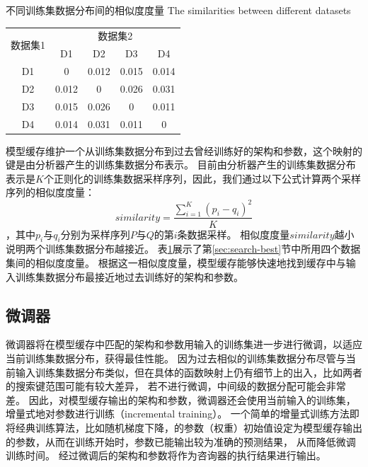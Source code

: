 \begin{table}[!hpb]
  \centering
  \bicaption[不同训练集数据分布间的相似度度量]
    {不同训练集数据分布间的相似度度量}
    {The similarities between different datasets}
  \label{tab:similarity}
  \begin{tabular}{ccccc}
    \toprule
    \multirow{2}{*}{数据集1}  & \multicolumn{4}{c}{数据集2}              \\ \cmidrule{2-5}
                                & D1   & D2   & D3   & D4   \\ \midrule
    D1                          & 0  & 0.012  & 0.015  & 0.014  \\
    D2                          & 0.012  & 0  & 0.026  & 0.031  \\
    D3                          & 0.015  & 0.026  & 0  & 0.011  \\
    D4                          & 0.014  & 0.031  & 0.011  & 0  \\ \bottomrule
  \end{tabular}
\end{table}

模型缓存维护一个从训练集数据分布到过去曾经训练好的{\rmi}架构和参数，这个映射的键是由分析器产生的训练集数据分布表示。
目前由分析器产生的训练集数据分布表示是$K$个正则化的训练集数据采样序列，因此，我们通过以下公式计算两个采样序列的相似度度量：
\[
  similarity = \frac{ \sum_{i=1}^{K} (p_i - q_i)^2 }{ K }
\]
，其中$p_i$与$q_i$分别为采样序列$P$与$Q$的第$i$条数据采样。
相似度度量$similarity$越小说明两个训练集数据分布越接近。
表\ref{tab:similarity}展示了第\ref{sec:search-best}节中所用四个数据集间的相似度度量。
根据这一相似度度量，模型缓存能够快速地找到缓存中与输入训练集数据分布最接近地过去训练好的{\rmi}架构和参数。


\subsection{微调器}

微调器将在模型缓存中匹配的{\rmi}架构和参数用输入的训练集进一步进行微调，以适应当前训练集数据分布，获得最佳性能。
因为过去相似的训练集数据分布尽管与当前输入训练集数据分布类似，但在具体的函数映射上仍有细节上的出入，比如两者的搜索键范围可能有较大差异，
若不进行微调，{\rmi}中间级{\model}的数据分配可能会非常差。
因此，对模型缓存输出的{\rmi}架构和参数，微调器还会使用当前输入的训练集，增量式地对{\model}参数进行训练（incremental training）。
一个简单的增量式训练方法即将经典训练算法，比如随机梯度下降，的参数（权重）初始值设定为模型缓存输出的参数，从而在训练开始时，参数已能输出较为准确的预测结果，
从而降低微调训练时间。
经过微调后的{\rmi}架构和参数将作为咨询器的执行结果进行输出。

